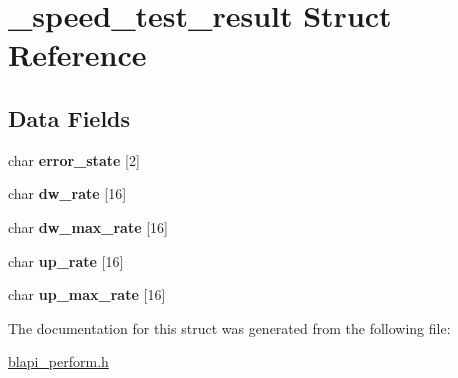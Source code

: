 \hypertarget{struct__speed__test__result}{}\section{\+\_\+speed\+\_\+test\+\_\+result Struct Reference}
\label{struct__speed__test__result}
\subsection*{Data Fields}
\begin{DoxyCompactItemize}
\item 
\mbox{\label{struct__speed__test__result_ac66ee131abeb8882a5948aadb2f7fbfd}} 
char {\bfseries error\+\_\+state} \mbox{[}2\mbox{]}
\item 
\mbox{\label{struct__speed__test__result_a0d728e33b6e7a434dbef35aae6ba8c68}} 
char {\bfseries dw\+\_\+rate} \mbox{[}16\mbox{]}
\item 
\mbox{\label{struct__speed__test__result_a7d114d4d752af6bc8e9ef948537dcb12}} 
char {\bfseries dw\+\_\+max\+\_\+rate} \mbox{[}16\mbox{]}
\item 
\mbox{\label{struct__speed__test__result_a952da91bd61fb0314154d98a50803816}} 
char {\bfseries up\+\_\+rate} \mbox{[}16\mbox{]}
\item 
\mbox{\label{struct__speed__test__result_aacedc20c7426aeb1cfa4e39e9f049d96}} 
char {\bfseries up\+\_\+max\+\_\+rate} \mbox{[}16\mbox{]}
\end{DoxyCompactItemize}


The documentation for this struct was generated from the following file\+:\begin{DoxyCompactItemize}
\item 
\hyperlink{blapi__perform_8h}{blapi\+\_\+perform.\+h}\end{DoxyCompactItemize}
